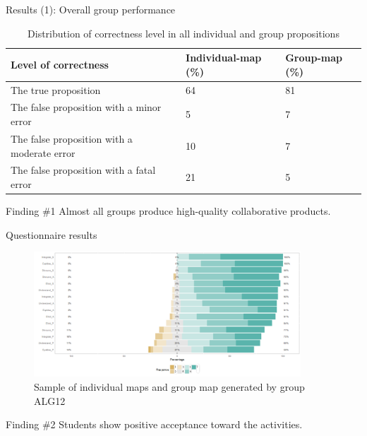 \begin{frame}[allowframebreaks]{Results (1): Overall group performance}
\begin{table}[tb]
    \caption{Distribution of correctness level in all individual and group propositions}
    \label{dist_correct}
    \begin{center}
        \begin{tabular}{ p{6cm}|p{1.5cm}|p{1.5cm}  }
            \hline
            Level of correctness & Individual-map (\%) & Group-map (\%)\\
            \hline
            The true proposition & 64 & 81 \\
            The false proposition with a minor error & 5 & 7 \\
            The false proposition with a moderate error & 10 & 7 \\
            The false proposition with a fatal error & 21 & 5 \\
            \hline
        \end{tabular}
    \end{center}
\end{table}

\begin{block}{Finding \#1}
    Almost all groups produce high-quality collaborative products.
\end{block}

\end{frame}



\begin{frame}{Questionnaire results}
    \begin{figure}[tb]
    \begin{center}
        \includegraphics[width=100mm]{images/rqa_affective_response.pdf}
    \end{center}
    \caption{Sample of individual maps and group map generated by group ALG12}
    \label{a1::questionnaire}
\end{figure}

\begin{block}{Finding \#2}
    Students show positive acceptance toward the activities. 
\end{block}

\end{frame}

